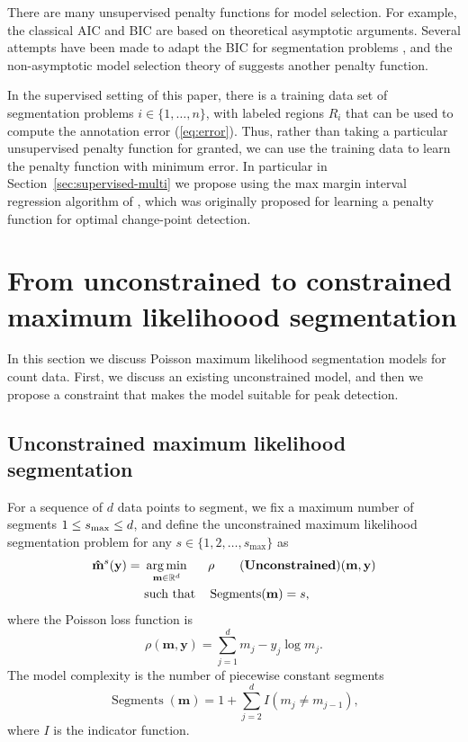 \documentclass{article}
\DeclareMathOperator*{\argmin}{arg\,min}
\DeclareMathOperator*{\Segments}{Segments}
\newcommand{\RR}{\mathbb R}
\begin{document}
There are many unsupervised penalty functions for model selection. For
example, the classical AIC \citep{Akaike73} and BIC \citep{Schwarz78} are based
on theoretical asymptotic arguments. Several attempts have been made
to adapt the BIC for segmentation problems \citep{Yao88,
  mBIC}, and the non-asymptotic model selection theory of
\citet{cleynen2013segmentation} suggests another penalty function.

In the supervised setting of this paper, there is a training data set
of segmentation problems $i\in\{1, \dots, n\}$, with labeled regions
$R_i$ that can be used to compute the annotation error
(\ref{eq:error}). Thus, rather than taking a particular unsupervised
penalty function for granted, we can use the training data to learn
the penalty function with minimum error. In particular in
Section~\ref{sec:supervised-multi} we propose using the max margin interval
regression algorithm of \citet{HOCKING-penalties}, which was
originally proposed for learning a penalty function for optimal
change-point detection.

\section{From unconstrained to constrained maximum likelihoood
  segmentation}
\label{sec:model}

In this section we discuss Poisson maximum likelihood segmentation
models for count data. First, we discuss an existing unconstrained
model, and then we propose a constraint that makes the model suitable
for peak detection.

\subsection{Unconstrained maximum likelihood segmentation}

For a sequence of $d$ data points to segment, we fix a maximum number
of segments $1 \leq s_{\text{\text{max}}}\leq d$, and define the
unconstrained maximum likelihood segmentation problem for
any $s\in\{1, 2, \dots, s_{\max}\}$ as
\begin{align*}
  \label{unconstrained}
  \mathbf{\hat m}^s(\mathbf y)  =\ 
  &\argmin_{\mathbf m\in\RR^{d}} && 
  \rho
  \tag{\textbf{Unconstrained}}
  (\mathbf m, \mathbf y) \\
  &\text{such that} && \Segments(\mathbf m)=s,
\end{align*}
where the Poisson loss function is
\begin{equation}
  \rho(\mathbf m, \mathbf y)= \sum_{j=1}^d m_j - y_j \log m_j.
\end{equation} 
The model complexity is the number of piecewise constant segments
\begin{equation}
  \Segments(\mathbf m)=1+\sum_{j=2}^d I(m_j \neq m_{j-1}),
\end{equation}
where $I$ is the indicator function. 
\end{document}
